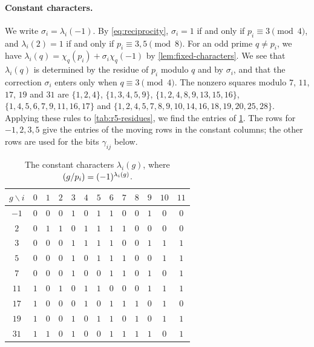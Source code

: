 \documentclass[12pt,oneside,openany]{book}
\theoremstyle{definition}
\theoremstyle{plain}
\numberwithin{equation}{chapter}
\theoremstyle{plain}
\theoremstyle{definition}
\theoremstyle{remark}
\newcommand{\leg}[2]{\mathchoice{\left(\frac{#1}{#2}\right)}{(#1/#2)}{(#1/#2)}{(#1/#2)}}
\begin{document}
\paragraph{Constant characters.} We write $\sigma_i=\lambda_i(-1)$. By \eqref{eq:reciprocity}, $\sigma_i=1$ if and only if $p_i\equiv3\pmod4$, and $\lambda_i(2)=1$ if and only if $p_i\equiv3,5\pmod8$. For an odd prime $q\ne p_i$, we have $\lambda_i(q)=\chi_q(p_i)+\sigma_i\chi_q(-1)$ by \cref{lem:fixed-characters}. We see that $\lambda_i(q)$ is determined by the residue of $p_i$ modulo $q$ and by $\sigma_i$, and that the correction $\sigma_i$ enters only when $q\equiv3\pmod4$. The nonzero squares modulo $7$, $11$, $17$, $19$ and $31$ are $\{1,2,4\}$, $\{1,3,4,5,9\}$, $\{1,2,4,8,9,13,15,16\}$, $\{1,4,5,6,7,9,11,16,17\}$ and $\{1,2,4,5,7,8,9,10,14,16,18,19,20,25,28\}$. Applying these rules to \cref{tab:r5-residues}, we find the entries of \cref{tab:r5-const-char}. The rows for $-1,2,3,5$ give the entries of the moving rows in the constant columns; the other rows are used for the bits $\gamma_{ij}$ below.

\begin{table}[htbp]
\centering
\caption{The constant characters $\lambda_i(g)$, where $\leg g{p_i}=(-1)^{\lambda_i(g)}$.}\label{tab:r5-const-char}
\begin{tabular}{c*{12}{c}}
\toprule
$g\backslash i$ & $0$ & $1$ & $2$ & $3$ & $4$ & $5$ & $6$ & $7$ & $8$ & $9$ & $10$ & $11$\\
\midrule
$-1$ & $0$ & $0$ & $0$ & $1$ & $0$ & $1$ & $1$ & $0$ & $0$ & $1$ & $0$ & $0$\\
$2$ & $0$ & $1$ & $1$ & $0$ & $1$ & $1$ & $1$ & $1$ & $0$ & $0$ & $0$ & $0$\\
$3$ & $0$ & $0$ & $0$ & $1$ & $1$ & $1$ & $1$ & $0$ & $0$ & $1$ & $1$ & $1$\\
$5$ & $0$ & $0$ & $0$ & $1$ & $0$ & $1$ & $1$ & $1$ & $0$ & $0$ & $1$ & $1$\\
\midrule
$7$ & $0$ & $0$ & $0$ & $1$ & $0$ & $0$ & $1$ & $1$ & $0$ & $1$ & $0$ & $1$\\
$11$ & $1$ & $0$ & $1$ & $0$ & $1$ & $1$ & $0$ & $0$ & $0$ & $1$ & $1$ & $1$\\
$17$ & $1$ & $0$ & $0$ & $0$ & $1$ & $0$ & $1$ & $1$ & $1$ & $0$ & $1$ & $0$\\
$19$ & $1$ & $0$ & $0$ & $1$ & $0$ & $1$ & $1$ & $0$ & $1$ & $0$ & $1$ & $1$\\
$31$ & $1$ & $1$ & $0$ & $1$ & $0$ & $0$ & $1$ & $1$ & $1$ & $1$ & $0$ & $1$\\
\bottomrule
\end{tabular}
\end{table}
\end{document}
